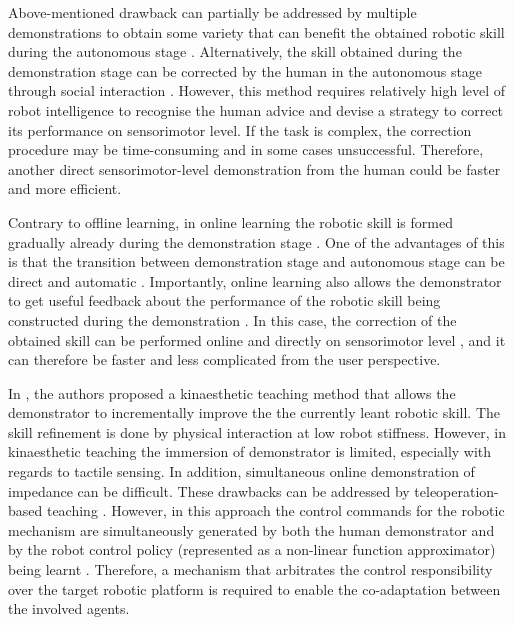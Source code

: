 Above-mentioned drawback can partially be addressed by multiple demonstrations to obtain some variety that can benefit the obtained robotic skill during the autonomous stage \cite{Ewerton2015}. Alternatively, the skill obtained during the demonstration stage can be corrected by the human in the autonomous stage through social interaction \cite{Nicolescu2003,Lockerd2004,Argall2007}. However, this method requires relatively high level of robot intelligence to recognise the human advice and devise a strategy to correct its performance on sensorimotor level. If the task is complex, the correction procedure may be time-consuming and in some cases unsuccessful. Therefore, another direct sensorimotor-level demonstration from the human could be faster and more efficient.

Contrary to offline learning, in online learning the robotic skill is formed gradually already during the demonstration stage \cite{Nguyen2011}. One of the advantages of this is that the transition between demonstration stage and autonomous stage can be direct and automatic \cite{Peternel2013b,Gams2009,Peternel2014}. Importantly, online learning also allows the demonstrator to get useful feedback about the performance of the robotic skill being constructed during the demonstration \cite{Lee2011,Peternel2013b,Peternel2016}. In this case, the correction of the obtained skill can be performed online and directly on sensorimotor level \cite{Lee2011,Peternel2016}, and it can therefore be faster and less complicated from the user perspective.

In \cite{Lee2011}, the authors proposed a kinaesthetic teaching method that allows the demonstrator to incrementally improve the the currently leant robotic skill. The skill refinement is done by physical interaction at low robot stiffness. However, in kinaesthetic teaching the immersion of demonstrator is limited, especially with regards to tactile sensing. In addition, simultaneous online demonstration of impedance \cite{Peternel2014,Peternel2015} can be difficult. These drawbacks can be addressed by teleoperation-based teaching \cite{Evrard2009,Peternel2013b,Peternel2014}. However, in this approach the control commands for the robotic mechanism are simultaneously generated by both the human demonstrator and by the robot control policy (represented as a non-linear function approximator) being learnt \cite{Peternel2013b}. Therefore, a mechanism that arbitrates the control responsibility over the target robotic platform is required to enable the co-adaptation between the involved agents.

